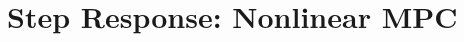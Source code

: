 \ETHslide
\section*{Step Response: Nonlinear MPC}
\vspace*{\fill}

\begin{minipage}{0.5\textwidth}
	\centering
	\tiny{
	
	}
\end{minipage}
\begin{minipage}{0.5\textwidth}
\tiny{

}
\end{minipage}

\vspace*{\fill}
\clearpage